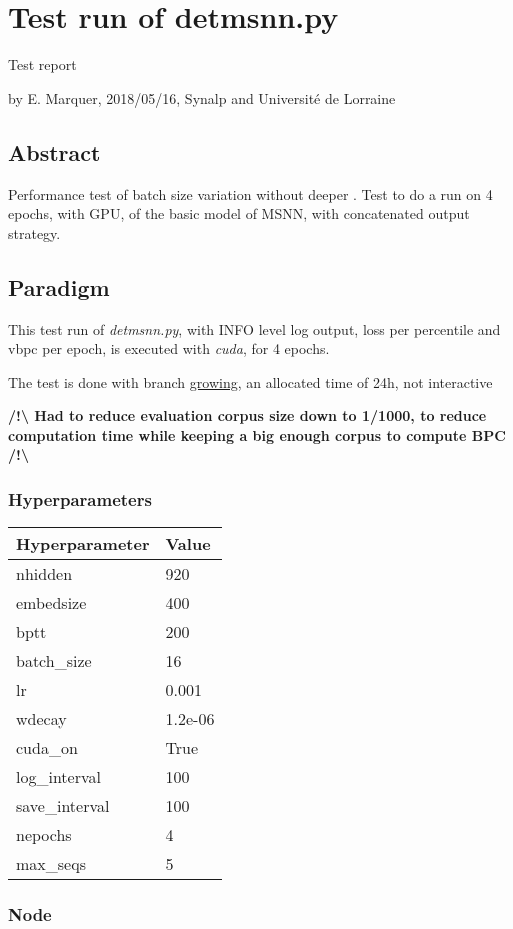 \section*{Test run of detmsnn.py}

Test report

by E. Marquer, 2018/05/16, Synalp and Université de Lorraine

\subsection{Abstract}

Performance test of batch size variation without deeper . Test to do a
run on 4 epochs, with GPU, of the basic model of MSNN, with concatenated
output strategy.

\subsection{Paradigm}

This test run of \emph{detmsnn.py}, with INFO level log output, loss per
percentile and vbpc per epoch, is executed with \emph{cuda}, for 4
epochs.

The test is done with branch
\href{https://gitlab.inria.fr/emarquer/awd-lstm-lm/tree/growing}{growing},
an allocated time of 24h, not interactive

\textbf{/!\textbackslash{} Had to reduce evaluation corpus size down to
1/1000, to reduce computation time while keeping a big enough corpus to
compute BPC /!\textbackslash{}}

\subsubsection{Hyperparameters}

\begin{longtable}[]{@{}ll@{}}
\hline
Hyperparameter & Value\tabularnewline
\hline
\endhead
nhidden & 920\tabularnewline
embedsize & 400\tabularnewline
bptt & 200\tabularnewline
batch\_size & 16\tabularnewline
lr & 0.001\tabularnewline
wdecay & 1.2e-06\tabularnewline
cuda\_on & True\tabularnewline
log\_interval & 100\tabularnewline
save\_interval & 100\tabularnewline
nepochs & 4\tabularnewline
max\_seqs & 5\tabularnewline
\hline
\end{longtable}

\subsubsection{Node}

